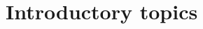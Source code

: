\documentclass[minimal.tex]{subfiles}
\begin{document}
\section{Introductory topics}


\end{document}
